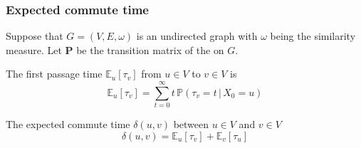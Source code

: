 \documentclass[professionalfonts, hyperref={pdfpagelabels=false,
  colorlinks=true, linkcolor=purple}]{beamer}
\begin{document}
\begin{frame}
  \frametitle{Expected commute time}
    Suppose that $G = (V,E,\omega)$ is an undirected graph with $\omega$
    being the similarity measure. Let $\bm{P}$ be the transition matrix of
    the \hyperlink{random-walks}{} on
    $G$. 
    \begin{definition}
      \label{def:3}
      The first passage time $\mathbb{E}_{u}[\tau_v]$ from $u
      \in V$ to $v \in V$ is 
      \begin{equation}
        \label{eq:10}
        \mathbb{E}_{u}[\tau_v] = \sum_{t = 0}^{\infty}{t \,
          \mathbb{P}(\tau_v = t \, | \, X_0 = u)} 
      \end{equation}
    \end{definition}  

    \begin{definition}
      \label{def:4}
      The expected commute time $\delta(u,v)$ between $u \in V$ and $v \in V$
      \begin{equation}
        \label{eq:11}
        \delta(u,v) = \mathbb{E}_{u}[\tau_v] +
          \mathbb{E}_{v}[\tau_u]
      \end{equation}
    \end{definition}
\end{frame}
\end{document}
